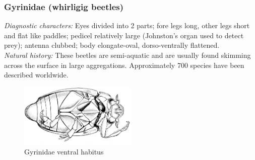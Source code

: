 \documentclass[letterpaper, 11pt]{article}
\begin{document}
\subsubsection{Gyrinidae (whirligig beetles)}
\noindent{}\textit{Diagnostic characters:} Eyes divided into 2 parts; fore legs long, other legs short and flat like paddles; pedicel relatively large (Johnston's organ used to detect prey); antenna clubbed; body elongate-oval, dorso-ventrally flattened. \\

\noindent{}\textit{Natural history:} These beetles are semi-aquatic and are usually found skimming across the surface in large aggregations. Approximately 700 species have been described worldwide.

\begin{figure}[ht!]
  \centering
    \includegraphics[width=0.5\textwidth]{gyrinid.png}
  \caption{Gyrinidae ventral habitus \citep[][Fig. 99B]{bhlitem56570}}
  \label{fig:gyrnidhabitus}
\end{figure}
\end{document}
